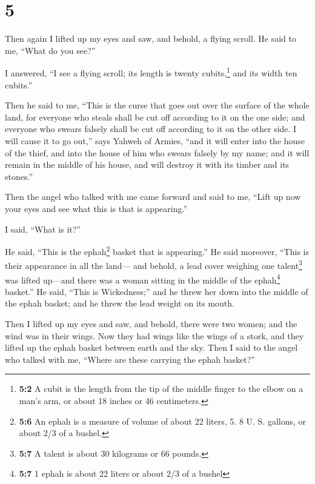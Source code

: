 \hypertarget{section-4}{%
\section{5}\label{section-4}}

 Then again I lifted up my eyes and saw, and behold, a
flying scroll.  He said to me, ``What do you see?''

I answered, ``I see a flying scroll; its length is twenty
cubits,\footnote{\textbf{5:2} A cubit is the length from the tip of the
  middle finger to the elbow on a man's arm, or about 18 inches or 46
  centimeters.} and its width ten cubits.''

 Then he said to me, ``This is the curse that goes out
over the surface of the whole land, for everyone who steals shall be cut
off according to it on the one side; and everyone who swears falsely
shall be cut off according to it on the other side.  I
will cause it to go out,'' says Yahweh of Armies, ``and it will enter
into the house of the thief, and into the house of him who swears
falsely by my name; and it will remain in the middle of his house, and
will destroy it with its timber and its stones.''

 Then the angel who talked with me came forward and said
to me, ``Lift up now your eyes and see what this is that is appearing.''

 I said, ``What is it?''

He said, ``This is the ephah\footnote{\textbf{5:6} An ephah is a measure
  of volume of about 22 liters, 5. 8 U. S. gallons, or about 2/3 of a
  bushel.} basket that is appearing.'' He said moreover, ``This is their
appearance in all the land---  and behold, a lead cover
weighing one talent\footnote{\textbf{5:7} A talent is about 30 kilograms
  or 66 pounds.} was lifted up---and there was a woman sitting in the
middle of the ephah\footnote{\textbf{5:7} 1 ephah is about 22 liters or
  about 2/3 of a bushel} basket.''  He said, ``This is
Wickedness;'' and he threw her down into the middle of the ephah basket;
and he threw the lead weight on its mouth.

 Then I lifted up my eyes and saw, and behold, there were
two women; and the wind was in their wings. Now they had wings like the
wings of a stork, and they lifted up the ephah basket between earth and
the sky.  Then I said to the angel who talked with me,
``Where are these carrying the ephah basket?''

